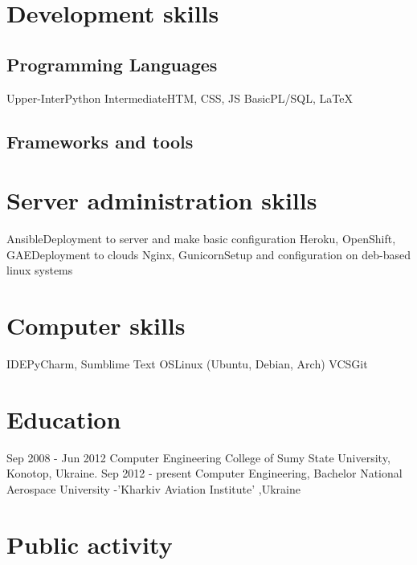 \documentclass[11pt,a4paper]{moderncv}
\begin{document}
	
	
	\section{Development skills}
	\subsection{Programming Languages}
	\cvline
	{Upper-Inter}{Python}
	\cvline
	{Intermediate}{HTM, CSS, JS}
	\cvline
	{Basic}{PL/SQL, LaTeX}
	\subsection{Frameworks and tools}
	
	\section{Server administration skills}
	\cvline
	{Ansible}{Deployment to server and make basic configuration}
	\cvline
	{Heroku, OpenShift, GAE}{Deployment to clouds}
	\cvline
	{Nginx, Gunicorn}{Setup and configuration on deb-based linux systems}
	
	\section{Computer skills}
	\cvline
	{IDE}{PyCharm, Sumblime Text}
	\cvline
	{OS}{Linux (Ubuntu, Debian, Arch)}
	\cvline
	{VCS}{Git}
	
	
	\section{Education}
	\cventry
	{Sep 2008 - Jun 2012}
	{Computer Engineering}
	{College of Sumy State University, Konotop, Ukraine.}
	{}{}{}
	\cventry
	{Sep 2012 - present}
	{Computer Engineering, Bachelor}
	{National Aerospace University -'Kharkiv Aviation Institute' ,Ukraine}
	{}{}{}
	
	\section{Public activity}
	
\end{document}
